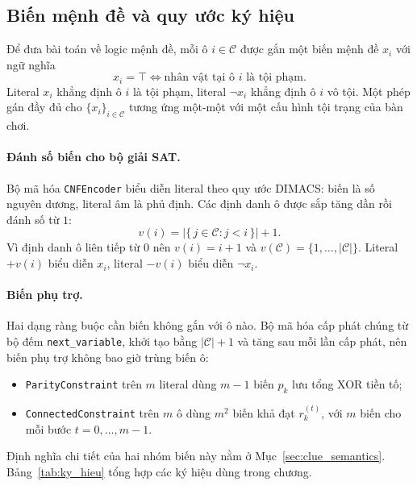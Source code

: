 \subsection{Biến mệnh đề và quy ước ký hiệu}
\label{sec:prop_vars}

Để đưa bài toán về logic mệnh đề, mỗi ô $i \in \mathcal{C}$ được gắn một biến
mệnh đề $x_i$ với ngữ nghĩa
\begin{equation}
  x_i = \top \iff \text{nhân vật tại ô } i \text{ là tội phạm}.
  \label{eq:prop_var}
\end{equation}
Literal $x_i$ khẳng định ô $i$ là tội phạm, literal $\neg x_i$ khẳng định ô $i$
vô tội. Một phép gán đầy đủ cho $\{x_i\}_{i\in\mathcal{C}}$ tương ứng một-một
với một cấu hình tội trạng của bàn chơi.

\paragraph{Đánh số biến cho bộ giải SAT.}
Bộ mã hóa \texttt{CNFEncoder} biểu diễn literal theo quy ước DIMACS: biến là
số nguyên dương, literal âm là phủ định. Các định danh ô được sắp tăng dần rồi
đánh số từ $1$:
\begin{equation}
  v(i) = \bigl|\{\, j \in \mathcal{C} : j < i \,\}\bigr| + 1 .
  \label{eq:dimacs_var}
\end{equation}
Vì định danh ô liên tiếp từ $0$ nên $v(i) = i + 1$ và
$v(\mathcal{C}) = \{1, \ldots, |\mathcal{C}|\}$. Literal $+v(i)$ biểu diễn
$x_i$, literal $-v(i)$ biểu diễn $\neg x_i$.

\paragraph{Biến phụ trợ.}
Hai dạng ràng buộc cần biến không gắn với ô nào. Bộ mã hóa cấp phát chúng từ
bộ đếm \texttt{next\_variable}, khởi tạo bằng $|\mathcal{C}|+1$ và tăng sau mỗi
lần cấp phát, nên biến phụ trợ không bao giờ trùng biến ô:
\begin{itemize}
  \item \texttt{ParityConstraint} trên $m$ literal dùng $m-1$ biến $p_k$ lưu
    tổng XOR tiền tố;
  \item \texttt{ConnectedConstraint} trên $m$ ô dùng $m^2$ biến khả đạt
    $r_k^{(t)}$, với $m$ biến cho mỗi bước $t = 0, \ldots, m-1$.
\end{itemize}
Định nghĩa chi tiết của hai nhóm biến này nằm ở Mục~\ref{sec:clue_semantics}.
Bảng~\ref{tab:ky_hieu} tổng hợp các ký hiệu dùng trong chương.

